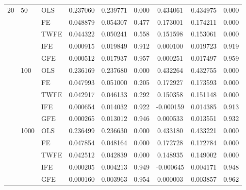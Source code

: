\begin{tabular}{lll|ccc|ccc}
20 & 50   & OLS  &  0.237060 &  0.239771 &                 0.000 &  0.434061 &  0.434975 &                 0.000    \\
   &       & FE  &  0.048879 &  0.054307 &                 0.477 &  0.173001 &  0.174211 &                 0.000 \\
   &      & TWFE  &  0.044322 &  0.050241 &                 0.558 &  0.151598 &  0.153061 &                 0.000 \\
   &      & IFE   &  0.000915 &  0.019849 &                 0.912 &  0.000100 &  0.019723 &                 0.919 \\
   &      & GFE  &  0.000512 &  0.017937 &                 0.957 &  0.000251 &  0.017497 &                 0.959 \\
   & 100  & OLS  &  0.236169 &  0.237680 &                 0.000 &  0.432264 &  0.432755 &                 0.000 \\
   &      & FE  &  0.047993 &  0.051000 &                 0.205 &  0.172927 &  0.173593 &                 0.000 \\
   &      & TWFE  &  0.042917 &  0.046133 &                 0.292 &  0.150358 &  0.151148 &                 0.000 \\
   &      & IFE    &  0.000654 &  0.014032 &                 0.922 & -0.000159 &  0.014385 &                 0.913 \\
   &      & GFE  &  0.000265 &  0.013012 &                 0.946 &  0.000533 &  0.013551 &                 0.932 \\
   & 1000 & OLS  &  0.236499 &  0.236630 &                 0.000 &  0.433180 &  0.433221 &                 0.000 \\
   &      & FE  &  0.047854 &  0.048164 &                 0.000 &  0.172728 &  0.172784 &                 0.000 \\
   &      & TWFE  &  0.042512 &  0.042839 &                 0.000 &  0.148935 &  0.149002 &                 0.000 \\
   &      & IFE    &  0.000205 &  0.004213 &                0.949 & -0.000645 &  0.004171 &                 0.948 \\
   &      & GFE  &  0.000160 &  0.003963 &                 0.954 &  0.000003 &  0.003857 &                 0.962 \\
\bottomrule
\end{tabular}
